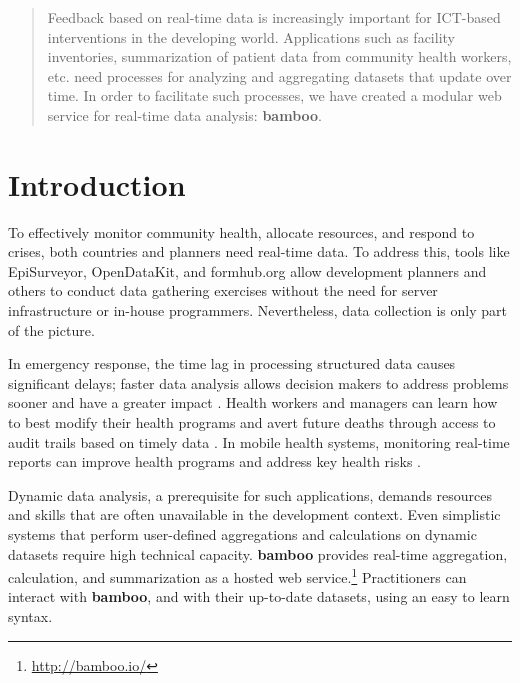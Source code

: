\documentclass{sig-alternate}
\begin{document}
\maketitle
\begin{abstract}
Feedback based on real-time data is increasingly important for ICT-based interventions in the developing world. Applications such as 
facility inventories,
summarization of patient data from community health workers, 
etc. need processes for analyzing and aggregating datasets that update over
time. In order to facilitate such processes, we have created a modular web
service for real-time data analysis: \textbf{bamboo}.
\end{abstract}




\section{Introduction}
To effectively monitor community health, allocate resources, and respond to crises, both countries and planners need real-time data. 
To address this, tools like EpiSurveyor, OpenDataKit, and
formhub.org allow development planners and others to conduct data gathering exercises without the need for server infrastructure or in-house programmers.  
Nevertheless, data collection is only part of the picture.

In emergency response, the time lag in processing structured data causes significant delays; faster data analysis allows decision makers to address problems sooner and have a greater impact \cite{internews}.
Health workers and managers can learn how to best modify their health programs
and avert future deaths
through access to audit trails based on timely data \cite{krisberg}.
In mobile health systems, monitoring real-time reports can improve health programs and address key health risks \cite{mechael}.  

Dynamic data analysis, a prerequisite for such applications, demands resources
and skills that are often unavailable in the development context.  Even
simplistic systems that perform user-defined aggregations and calculations on
dynamic datasets require high technical capacity.  \textbf{bamboo} provides real-time
aggregation, calculation, and summarization as a hosted web
service.\footnote{\url{http://bamboo.io/}}  Practitioners can interact with
\textbf{bamboo}, and with their up-to-date datasets, using an easy to learn syntax.
\end{document}
